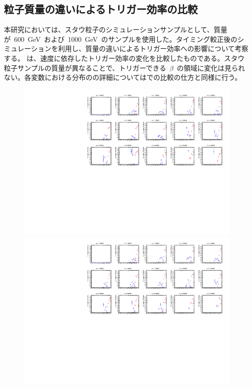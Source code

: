 \subsection{粒子質量の違いによるトリガー効率の比較}\label{sec:trimass}
本研究においては、スタウ粒子のシミュレーションサンプルとして、質量が~600~GeV~および~1000~GeV~のサンプルを使用した。タイミング較正後のシミュレーションを利用し、質量の違いによるトリガー効率への影響について考察する。
は、速度に依存したトリガー効率の変化を比較したものである。スタウ粒子サンプルの質量が異なることで、トリガーできる~$\beta$~の領域に変化は見られない。各変数における分布のの詳細についてはでの比較の仕方と同様に行う。
\begin{figure}[H]
    \begin{minipage}{0.49\hsize}
    \centering   
    \includegraphics[width=\textwidth,page=2]{img/rec/stau_600.pdf}
    \subcaption{}
    \end{minipage}
    \begin{minipage}{0.49\hsize}
    \centering   
    \includegraphics[width=\textwidth,page=2]{img/rec/stau_1000.pdf}

\end{minipage}
\end{figure}
